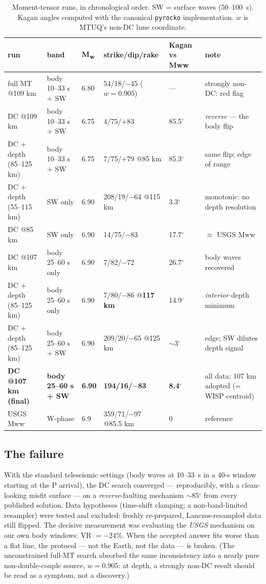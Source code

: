 \documentclass[11pt]{article}
\newcommand{\Mw}{M\textsubscript{w}}
\begin{document}
\begin{table}[H]\centering\footnotesize\setlength{\tabcolsep}{3.5pt}
\begin{tabular}{llllll}\toprule
run & band & \Mw & strike/dip/rake & Kagan vs Mww & note\\\midrule
full MT @109 km & body 10--33 s + SW & 6.80 & 54/18/$-$45 ($w{=}0.905$) & --- & strongly non-DC: red flag\\
DC @109 km & body 10--33 s + SW & 6.75 & 4/75/$+$83 & 85.5$^\circ$ & \emph{reverse} --- the body flip\\
DC + depth (85--125 km) & body 10--33 s + SW & 6.75 & 7/75/$+$79 @85 km & 85.3$^\circ$ & same flip; edge of range\\
DC + depth (55--115 km) & SW only & 6.90 & 208/19/$-$64 @115 km & 3.3$^\circ$ & monotonic: no depth resolution\\
DC @85 km & SW only & 6.90 & 14/75/$-$83 & 17.7$^\circ$ & $\approx$ USGS Mww\\
DC @107 km & body 25--60 s only & 6.90 & 7/82/$-$72 & 26.7$^\circ$ & body waves recovered\\
DC + depth (85--125 km) & body 25--60 s only & 6.90 & 7/80/$-$86 @\textbf{117 km} & 14.9$^\circ$ & \emph{interior} depth minimum\\
DC + depth (85--125 km) & body 25--60 s + SW & 6.90 & 209/20/$-$65 @125 km & $\sim$3$^\circ$ & edge; SW dilutes depth signal\\
\textbf{DC @107 km (final)} & \textbf{body 25--60 s + SW} & \textbf{6.90} & \textbf{194/16/$-$83} &
\textbf{8.4$^\circ$} & all data; 107 km adopted (= WISP centroid)\\
USGS Mww & W-phase & 6.9 & 359/71/$-$97 @85.5 km & 0 & reference\\\bottomrule
\end{tabular}
\caption{Moment-tensor runs, in chronological order. SW = surface waves (50--100~s). Kagan
angles computed with the canonical \texttt{pyrocko} implementation. $w$ is MTUQ's non-DC lune
coordinate.}
\label{tab:mt}
\end{table}

\subsection{The failure}
With the standard teleseismic settings (body waves at 10--33~s in a 40-s window starting at
the P arrival), the DC search converged --- reproducibly, with a clean-looking misfit surface
--- on a \emph{reverse}-faulting mechanism $\sim$85$^\circ$ from every published solution. Data
hypotheses (time-shift clamping; a non-band-limited resampler) were tested and excluded: freshly
re-prepared, Lanczos-resampled data still flipped. The decisive measurement was evaluating the
\emph{USGS} mechanism on our own body windows: VR $= -24\%$. When the accepted answer fits
worse than a flat line, the protocol --- not the Earth, not the data --- is broken. (The
unconstrained full-MT search absorbed the same inconsistency into a nearly pure non-double-couple
source, $w=0.905$: at depth, a strongly non-DC result should be read as a symptom, not a
discovery.)
\end{document}
